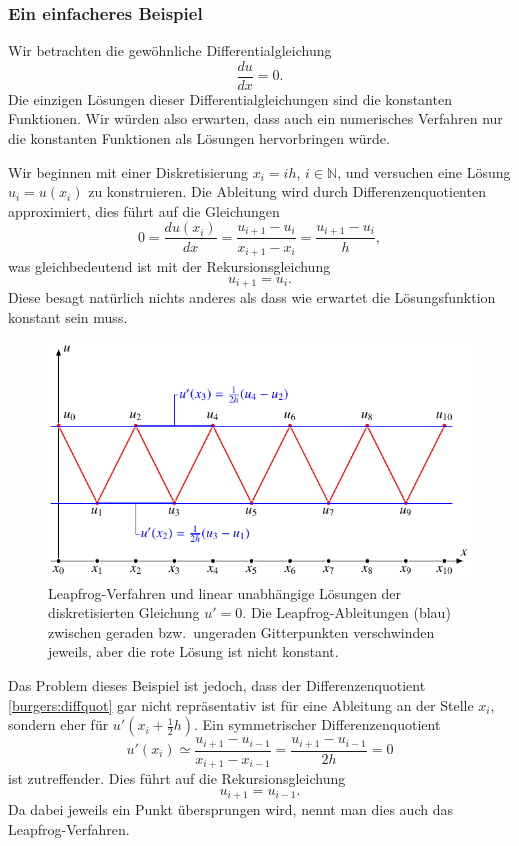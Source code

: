 \subsubsection{Ein einfacheres Beispiel}
Wir betrachten die gewöhnliche Differentialgleichung
\begin{equation}
\frac{du}{dx}=0.
\label{burgers:konstant}
\end{equation}
Die einzigen Lösungen dieser Differentialgleichungen sind die konstanten
Funktionen.
Wir würden also erwarten, dass auch ein numerisches Verfahren nur
die konstanten Funktionen als Lösungen hervorbringen würde.

Wir beginnen mit einer Diskretisierung $x_i=ih$, $i\in\mathbb N$, und
versuchen eine Lösung $u_i= u(x_i)$ zu konstruieren.
Die Ableitung wird durch Differenzenquotienten approximiert, dies
führt auf die Gleichungen
\begin{equation}
0
=
\frac{du(x_i)}{dx}
=
\frac{u_{i+1}-u_{i}}{x_{i+1}-x_{i}} = \frac{u_{i+1}-u_i}{h},
\label{burgers:diffquot}
\end{equation}
was gleichbedeutend ist mit der Rekursionsgleichung
\[
u_{i+1} = u_{i}.
\]
Diese besagt natürlich nichts anderes als dass wie erwartet
die Lösungsfunktion konstant sein muss.

\begin{figure}
\centering
\includegraphics{learning/leapfrog.pdf}
\caption{Leapfrog-Verfahren und linear unabhängige Lösungen der 
diskretisierten Gleichung $u'=0$.
Die Leapfrog-Ableitungen ({\color{blue}blau})
zwischen geraden bzw.~ungeraden Gitterpunkten
verschwinden jeweils, aber die {\color{red}rote} Lösung ist nicht konstant.
\label{burgers:leapfrogbild}}
\end{figure}

Das Problem dieses Beispiel ist jedoch, dass der Differenzenquotient
\eqref{burgers:diffquot} gar nicht repräsentativ ist für eine Ableitung
an der Stelle $x_i$, sondern eher für $u'(x_i+\frac12h)$.
Ein symmetrischer Differenzenquotient 
\[
u'(x_i)
\simeq
\frac{u_{i+1}-u_{i-1}}{x_{i+1}-x_{i-1}}=\frac{u_{i+1}-u_{i-1}}{2h}=0
\]
ist zutreffender.
Dies führt auf die Rekursionsgleichung
\begin{equation}
u_{i+1}=u_{i-1}.
\label{burgers:leapfrog}
\end{equation}
Da dabei jeweils ein Punkt übersprungen wird, nennt man dies auch das
Leapfrog-Verfahren.

